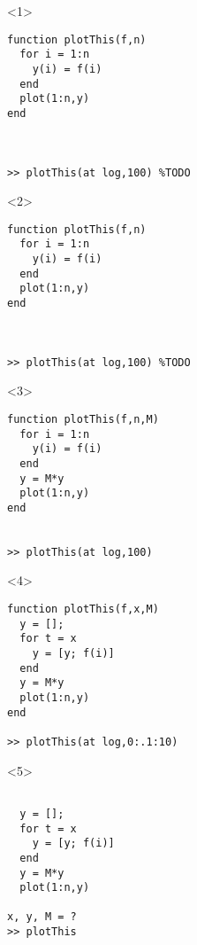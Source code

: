 \begin{frame}[fragile]
  \begin{columns}
    \begin{column}{5cm}
      \begin{onlyenv}<1>
        \begin{Verbatim}[commandchars=@\[\]]
function plotThis(f,n)
  for i = 1:n
    y(i) = f(i)
  end
  plot(1:n,y)
end



>> plotThis(at log,100) %TODO
        \end{Verbatim}
      \end{onlyenv}
      \begin{onlyenv}<2>
        \begin{Verbatim}[commandchars=@\[\]]
function plotThis(f,n)
  for i = 1:n
    y(i) = f(i)
  end
  plot(1:n,y)
end



>> plotThis(at log,100) %TODO
        \end{Verbatim}
      \end{onlyenv}
      \begin{onlyenv}<3>
        \begin{Verbatim}[commandchars=@\[\]]
function plotThis(f,n,M)
  for i = 1:n
    y(i) = f(i)
  end
  y = M*y
  plot(1:n,y)
end


>> plotThis(at log,100)
        \end{Verbatim}
      \end{onlyenv}
      \begin{onlyenv}<4>
        \begin{Verbatim}[commandchars=@\[\]]
function plotThis(f,x,M)
  y = [];
  for t = x
    y = [y; f(i)]
  end
  y = M*y
  plot(1:n,y)
end

>> plotThis(at log,0:.1:10)
        \end{Verbatim}
      \end{onlyenv}
      \begin{onlyenv}<5>
        \begin{Verbatim}[commandchars=@\[\]]

  y = [];
  for t = x
    y = [y; f(i)]
  end
  y = M*y
  plot(1:n,y)

x, y, M = ?
>> plotThis
        \end{Verbatim}
      \end{onlyenv}
    \end{column}



\end{columns}
\end{frame}
